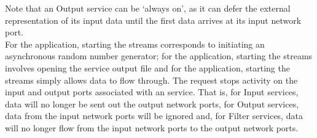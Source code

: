 Note that an Output service can be `always on', as it can defer the external
representation of its input data until the first data arrives at its input \yarp{}
network port.\\

For the  application, starting the
streams corresponds to initiating an asynchronous random number generator; for the
 application, starting the streams
involves opening the service output file and for the
 application, starting the streams
simply allows data to flow through.
The  request stops activity on
the input and output ports associated with an  service.
That is, for Input services, data will no longer be sent out the output \yarp{} network
ports, for Output services, data from the input \yarp{} network ports will be ignored and,
for Filter services, data will no longer flow from the input \yarp{} network ports to the
output \yarp{} network ports.\\

